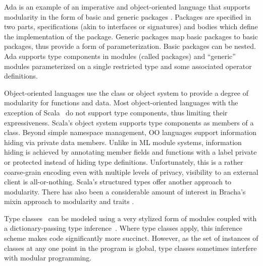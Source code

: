 Ada is an example of an imperative and object-oriented language that supports modularity in the form of basic and generic packages \cite{bray:impl}. Packages are specified in two parts, specifications (akin to interfaces or signatures) and bodies which define the implementation of the package. Generic packages map basic packages to basic packages, thus provide a form of parameterization. Basic packages can be nested. Ada supports type components in modules (called packages) and ``generic'' modules parameterized on a single restricted type and some associated operator definitions. 

Object-oriented languages use the class or object system to provide a degree of modularity for functions and data. Most object-oriented languages with the exception of Scala~\cite{odersky-et-al:ecoop03} do not support type components, thus limiting their expressiveness. Scala's object system supports type components as members of a class. Beyond simple namespace management, OO languages support information hiding via private data members. Unlike in ML module systems, information hiding is achieved by annotating member fields and functions with a label private or protected instead of hiding type definitions. Unfortunately, this is a rather coarse-grain encoding even with multiple levels of privacy, visibility to an external client is all-or-nothing. Scala's structured types offer another approach to modularity. There has also been a considerable amount of interest in Bracha's mixin approach to modularity \cite{brachacook:mixin,bracha:thesis,duggan96} and traits \cite{Scharli03traits:composable,typed-traits-tr}. 

		Type classes~\cite{wadlerblott} can be modeled using a very stylized form of modules coupled with a dictionary-passing type inference~\cite{dhck07}. Where type classes apply, this inference scheme makes code significantly more succinct. However, as the set of instances of classes at any one point in the program is global, type classes sometimes interfere with modular programming. 
		
